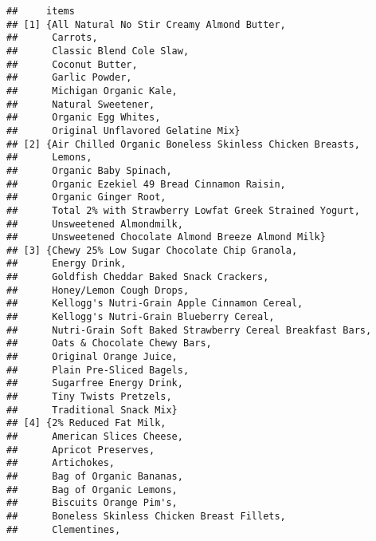 \documentclass[]{article}
\begin{document}
\begin{verbatim}
##     items                                                    
## [1] {All Natural No Stir Creamy Almond Butter,               
##      Carrots,                                                
##      Classic Blend Cole Slaw,                                
##      Coconut Butter,                                         
##      Garlic Powder,                                          
##      Michigan Organic Kale,                                  
##      Natural Sweetener,                                      
##      Organic Egg Whites,                                     
##      Original Unflavored Gelatine Mix}                       
## [2] {Air Chilled Organic Boneless Skinless Chicken Breasts,  
##      Lemons,                                                 
##      Organic Baby Spinach,                                   
##      Organic Ezekiel 49 Bread Cinnamon Raisin,               
##      Organic Ginger Root,                                    
##      Total 2% with Strawberry Lowfat Greek Strained Yogurt,  
##      Unsweetened Almondmilk,                                 
##      Unsweetened Chocolate Almond Breeze Almond Milk}        
## [3] {Chewy 25% Low Sugar Chocolate Chip Granola,             
##      Energy Drink,                                           
##      Goldfish Cheddar Baked Snack Crackers,                  
##      Honey/Lemon Cough Drops,                                
##      Kellogg's Nutri-Grain Apple Cinnamon Cereal,            
##      Kellogg's Nutri-Grain Blueberry Cereal,                 
##      Nutri-Grain Soft Baked Strawberry Cereal Breakfast Bars,
##      Oats & Chocolate Chewy Bars,                            
##      Original Orange Juice,                                  
##      Plain Pre-Sliced Bagels,                                
##      Sugarfree Energy Drink,                                 
##      Tiny Twists Pretzels,                                   
##      Traditional Snack Mix}                                  
## [4] {2% Reduced Fat Milk,                                    
##      American Slices Cheese,                                 
##      Apricot Preserves,                                      
##      Artichokes,                                             
##      Bag of Organic Bananas,                                 
##      Bag of Organic Lemons,                                  
##      Biscuits Orange Pim's,                                  
##      Boneless Skinless Chicken Breast Fillets,               
##      Clementines,                                            

\end{verbatim}
\end{document}
